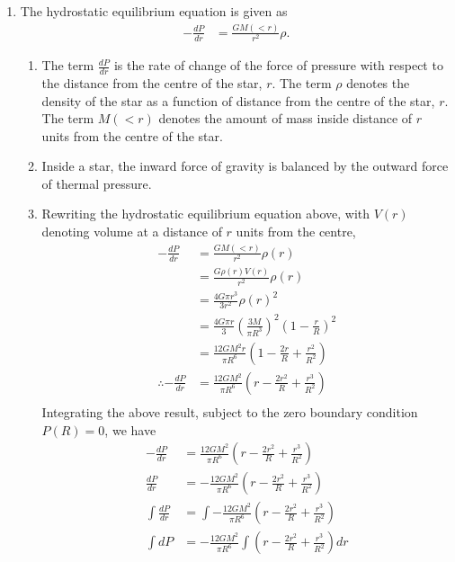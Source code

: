 \documentclass[a4paper,11pt]{article}
\newcommand{\ds}{\displaystyle}
\begin{document}
{{\begin{enumerate}[leftmargin=*]
\begin{enumerate}[label=\alph*)]
		\end{enumerate}
		\item The hydrostatic equilibrium equation is given as 
			\begin{align*}
				-\frac{dP}{dr} & = \frac{GM(<r)}{r^2}\rho.
			\end{align*}
			\begin{enumerate}[label=\alph*)]
			\item The term $\ds{\frac{dP}{dr}}$ is the rate of change of the force of pressure with respect to the distance from the centre of the star, $\ds{r}$. The term $\ds{\rho}$ denotes the density of the star as a function of distance from the centre of the star, $\ds{r}$. The term $\ds{M(<r)}$ denotes the amount of mass inside distance of $\ds{r}$ units from the centre of the star.
			\item Inside a star, the inward force of gravity is balanced by the outward force of thermal pressure.
				\pagebreak
			\item Rewriting the hydrostatic equilibrium equation above, with $\ds{V(r)}$ denoting volume at a distance of $\ds{r}$ units from the centre, 
				\begin{align*}
					-\frac{dP}{dr} & = \frac{GM(<r)}{r^2}\rho(r) \\
								   & = \frac{G\rho(r)V(r)}{r^2}\rho(r) \\
								   & = \frac{4G\pi r^3}{3r^2}\rho(r)^2 \\
								   & = \frac{4G\pi r}{3} \left(\frac{3M}{\pi R^3}\right)^2\left(1 - \frac{r}{R}\right)^2 \\
								   & = \frac{12GM^2r}{\pi R^6}\left(1 - \frac{2r}{R} + \frac{r^2}{R^2}\right) \\
					\therefore -\frac{dP}{dr} & = \frac{12GM^2}{\pi R^6}\left(r - \frac{2r^2}{R} + \frac{r^3}{R^2}\right) \\
				\end{align*}
				Integrating the above result, subject to the zero boundary condition $\ds{P(R) = 0}$, we have
				\begin{align*}
					-\frac{dP}{dr} & = \frac{12GM^2}{\pi R^6}\left(r - \frac{2r^2}{R} + \frac{r^3}{R^2}\right) \\
					\frac{dP}{dr} & = -\frac{12GM^2}{\pi R^6}\left(r - \frac{2r^2}{R} + \frac{r^3}{R^2}\right) \\
					\int \frac{dP}{dr} & = \int -\frac{12GM^2}{\pi R^6}\left(r - \frac{2r^2}{R} + \frac{r^3}{R^2}\right) \\
					\int dP & = -\frac{12GM^2}{\pi R^6} \int \left(r - \frac{2r^2}{R} + \frac{r^3}{R^2}\right) dr \\

\end{align*}
\end{enumerate}
\end{enumerate}}}
\end{document}
